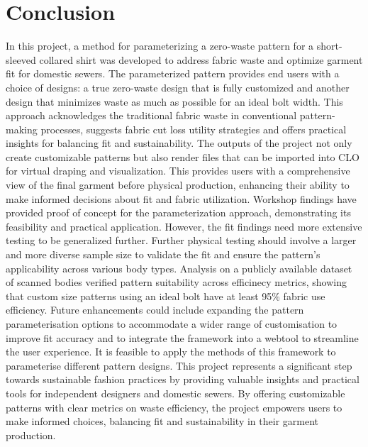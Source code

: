 \chapter{Conclusion}
In this project, a method for parameterizing a zero-waste pattern for a short-sleeved collared shirt was developed to address fabric waste and optimize garment fit for domestic sewers. The parameterized pattern provides end users with a choice of designs: a true zero-waste design that is fully customized and another design that minimizes waste as much as possible for an ideal bolt width. This approach acknowledges the traditional fabric waste in conventional pattern-making processes, suggests fabric cut loss utility strategies and offers practical insights for balancing fit and sustainability. The outputs of the project not only create customizable patterns but also render files that can be imported into CLO for virtual draping and visualization. This provides users with a comprehensive view of the final garment before physical production, enhancing their ability to make informed decisions about fit and fabric utilization. Workshop findings have provided proof of concept for the parameterization approach, demonstrating its feasibility and practical application. However, the fit findings need more extensive testing to be generalized further. Further physical testing should involve a larger and more diverse sample size to validate the fit and ensure the pattern’s applicability across various body types. Analysis on a publicly available dataset of scanned bodies verified pattern suitability across  efficinecy metrics, showing that custom size patterns using an ideal bolt have at least 95\% fabric use efficiency. Future enhancements could include expanding the pattern parameterisation options to accommodate a wider range of customisation to improve fit accuracy and to integrate the framework into a webtool to streamline the user experience. It is feasible to apply the methods of this framework to parameterise different pattern designs. This project represents a significant step towards sustainable fashion practices by providing valuable insights and practical tools for independent designers and domestic sewers. By offering customizable patterns with clear metrics on waste efficiency, the project empowers users to make informed choices, balancing fit and sustainability in their garment production.
